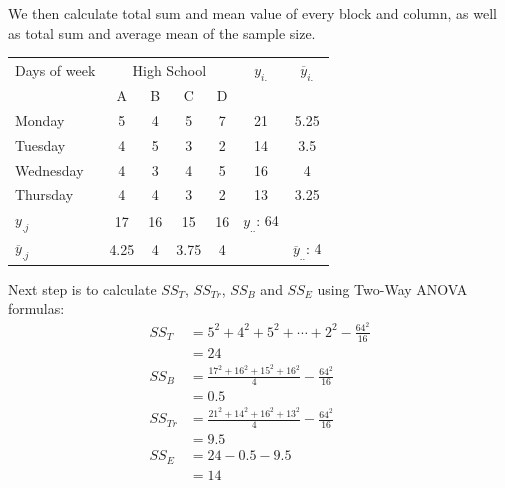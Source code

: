 \documentclass[a4paper]{article}
\numberwithin{equation}{section}
\begin{document}
We then calculate total sum and mean value of every block and column, as well as total sum and average mean of the sample size.
\begin{center}
  \begin{tabular}{lcccccc}
    \toprule
    Days of week          & \multicolumn{4}{c}{High School} & \(y_{i.}\) & \(\overline{y}_{i.}\)                                                  \\
    \cmidrule(lr){2-5}
                          & A                               & B          & C                     & D                                              \\
    \midrule
    Monday                & 5                               & 4          & 5                     & 7  & 21             & 5.25                     \\
    Tuesday               & 4                               & 5          & 3                     & 2  & 14             & 3.5                      \\
    Wednesday             & 4                               & 3          & 4                     & 5  & 16             & 4                        \\
    Thursday              & 4                               & 4          & 3                     & 2  & 13             & 3.25                     \\
    \midrule
    \(y_{.j}\)            & 17                              & 16         & 15                    & 16 & \(y_{..}\): 64                            \\
    \(\overline{y}_{.j}\) & 4.25                            & 4          & 3.75                  & 4  &                & \(\overline{y}_{..}\): 4 \\
    \bottomrule
  \end{tabular}
\end{center}

Next step is to calculate \(SS_{T}\), \(SS_{Tr}\), \(SS_{B}\) and \(SS_{E}\) using Two-Way ANOVA formulas:
\begin{align*}
  SS_{T}  & = 5^2 + 4^2 + 5^2 + \cdots  + 2^2 - \frac{64^2}{16}     \\
          & = 24                                                    \\
  SS_{B}  & = \frac{17^2 + 16^2 + 15^2 + 16^2}{4} - \frac{64^2}{16} \\
          & = 0.5                                                   \\
  SS_{Tr} & = \frac{21^2 + 14^2 + 16^2 + 13^2}{4} - \frac{64^2}{16} \\
          & = 9.5                                                   \\
  SS_{E}  & = 24 - 0.5 - 9.5                                        \\
          & = 14
\end{align*}
\end{document}
